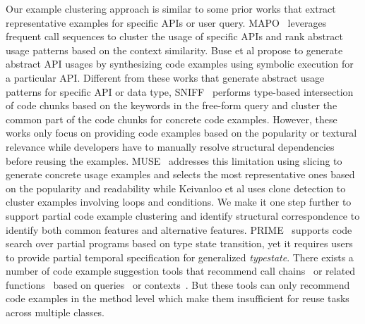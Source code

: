 Our example clustering approach is similar to some prior works that extract representative examples for specific APIs or user query. MAPO~\cite{MAPO:ECOOP09} leverages frequent call sequences to cluster the usage of specific APIs and rank abstract usage patterns based on the context similarity. Buse et al\/\cite{Buse:apiICSE12} propose to generate abstract API usages by synthesizing code examples using symbolic execution for a particular API. Different from these works that generate abstract usage patterns for specific API or data type, SNIFF~\cite{sniff:Sen09} performs type-based intersection of code chunks based on the keywords in the free-form query and cluster the common part of the code chunks for concrete code examples. However, these works   only focus on providing code examples based on the popularity or textural relevance while developers have to manually resolve structural dependencies before reusing the examples.   MUSE~\cite{MUSE:MarcusICSE15} addresses this limitation using slicing to generate concrete usage examples and selects the most representative ones based on the popularity and readability while  Keivanloo et al\/\cite{spotWork:ICSE14} uses clone detection to cluster examples involving loops and conditions. We make it one step further to support partial code example clustering and identify structural correspondence to identify both common features and alternative features. PRIME~\cite{Prime:OOPSLA12} supports code search over partial programs based on type state transition, yet it requires users to provide partial temporal specification for generalized {\it typestate}.  There exists a number of code example suggestion tools that recommend call chains~\cite{Mandelin:jungloid05, parseWeb:ASE07, Xsnippet:OOPSLA06} or related functions~\cite{Export:DenysASE13, Portfolio:DenysICSE11} based on queries~\cite{Sourcerer:SC14} or contexts~\cite{Holmes:structural05, Prompter:MSR14}. But these tools can only recommend code examples in the method level which make them insufficient for  reuse tasks across multiple classes.  


